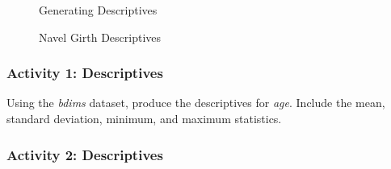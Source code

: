 \begin{figure}[H]
  \begin{center}
    \caption{Generating Descriptives}
    \label{lab04_fig01}
  \end{center}
\end{figure}

\begin{figure}[H]
  \begin{center}
    \caption{Navel Girth Descriptives}
    \label{lab04_fig02}    
  \end{center}
\end{figure}

\subsubsection{Activity 1: Descriptives} \label{lab04_act01}

Using the \textit{bdims} dataset, produce the descriptives for \textit{age}. Include the mean, standard deviation, minimum, and maximum statistics.

\subsubsection{Activity 2: Descriptives} \label{lab04_act02}

